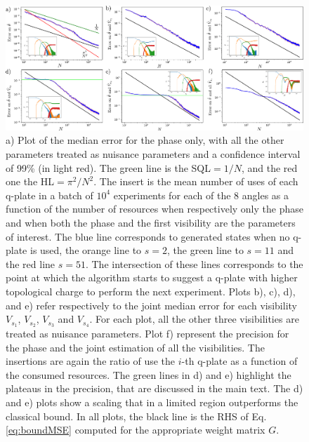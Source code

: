 \documentclass[aps,pra,twocolumn,notitlepage,superscriptaddress]{revtex4-1}
\begin{document}
%
\begin{figure}[!htb]
	\includegraphics[width=\textwidth]{precision_and_inserts.pdf}
	\caption{a) Plot of the median error for the phase only, with all the other parameters treated as nuisance parameters and a confidence interval of 99\% (in light red). The green line is the SQL$=1/N$, and the red one the HL$=\pi^2/N^2$. The insert is the mean number of uses of each q-plate in a batch of $10^4$ experiments for each of the $8$ angles as a function of the number of resources when respectively only the phase and when both the phase and the first visibility are the parameters of interest. The blue line corresponds to generated states when no q-plate is used, the orange line to $s=2$, the green line to $s=11$ and the red line $s=51$. The intersection of these lines corresponds to the point at which the algorithm starts to suggest a q-plate with higher topological charge to perform the next experiment. Plots b), c), d), and e) refer respectively to the joint median error for each visibility $V_{s_1}$, $V_{s_2}$, $V_{s_3}$ and $V_{s_4}$. For each plot, all the other three visibilities are treated as nuisance parameters. Plot f) represent the precision for the phase and the joint estimation of all the visibilities. The insertions are again the ratio of use the $i$-th q-plate as a function of the consumed resources. The green lines in d) and e) highlight the plateaus in the precision, that are discussed in the main text. The d) and e) plots show a scaling that in a limited region outperforms the classical bound. In all plots, the black line is the RHS of Eq.\ref{eq:boundMSE} computed for the appropriate weight matrix $G$.}
	\label{fig:phase}
\end{figure}
%
\end{document}
